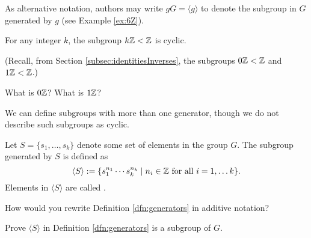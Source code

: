 \documentclass[../algebraNotesMSRI-UP2016.tex]{subfiles}
\begin{document}
\begin{frame}[c]
As alternative notation, authors may write $gG=\langle g\rangle$ to denote the subgroup in $G$ generated by $g$ (see Example \ref{ex:6Z}).


\smallGap
\begin{ex}\label{ex:kZcyclic}
For any integer $k$, the subgroup $k\mathbb Z<\mathbb Z$ is cyclic.  

\smallGap
(Recall, from Section \ref{subsec:identitiesInverses}, the subgroups $0\mathbb Z<\mathbb Z$ and $1\mathbb Z<\mathbb Z$.)
\end{ex}

\smallGap
\begin{que}
What is $0\mathbb Z$?  What is $1\mathbb Z$?
\end{que}
\end{frame}

\begin{frame}
We can define subgroups with more than one generator, though we do not describe such subgroups as cyclic.   

\smallGap 
\begin{dfn}\label{dfn:generators}
Let $S=\{s_1,\dots,s_k\}$ denote some set of elements in the group $G$.  The subgroup generated by $S$ is defined as
\[
\langle S\rangle%
:=\{s_1^{n_1}\cdots s_k^{n_k}\mid n_i\in \Z \text{ for all }i=1,\dots k\}.
\]
Elements in $\langle S\rangle$ are called .  
\end{dfn}

\smallGap
\begin{que}
How would you rewrite Definition \ref{dfn:generators} in additive notation?  
\end{que}

\smallGap
\begin{exe}[cf. Problem 51]\label{exe:prob51}
Prove $\langle S\rangle$ in Definition \ref{dfn:generators} is a subgroup of $G$. 
\end{exe}
\end{frame}
\end{document}
